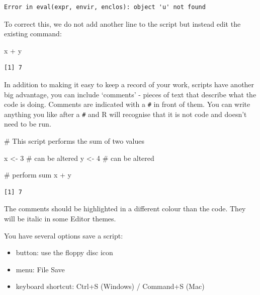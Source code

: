 \documentclass[
  letterpaper,
  DIV=11,
  numbers=noendperiod]{scrreprt}
\newenvironment{Shaded}{\begin{snugshade}}{\end{snugshade}}
\newcommand{\CommentTok}[1]{\textcolor[rgb]{0.37,0.37,0.37}{#1}}
\newcommand{\DecValTok}[1]{\textcolor[rgb]{0.68,0.00,0.00}{#1}}
\newcommand{\NormalTok}[1]{\textcolor[rgb]{0.00,0.23,0.31}{#1}}
\newcommand{\OtherTok}[1]{\textcolor[rgb]{0.00,0.23,0.31}{#1}}
\newcommand{\SpecialCharTok}[1]{\textcolor[rgb]{0.37,0.37,0.37}{#1}}
\providecommand{\tightlist}{%
  \setlength{\itemsep}{0pt}\setlength{\parskip}{0pt}}\usepackage{longtable,booktabs,array}
\begin{document}
\begin{verbatim}
Error in eval(expr, envir, enclos): object 'u' not found
\end{verbatim}

To correct this, we do not add another line to the script but instead
edit the existing command:

\begin{Shaded}
\begin{Highlighting}[]
\NormalTok{x }\SpecialCharTok{+}\NormalTok{ y}
\end{Highlighting}
\end{Shaded}

\begin{verbatim}
[1] 7
\end{verbatim}

In addition to making it easy to keep a record of your work, scripts
have another big advantage, you can include `comments' - pieces of text
that describe what the code is doing. Comments are indicated with a
\texttt{\#} in front of them. You can write anything you like after a
\texttt{\#} and R will recognise that it is not code and doesn't need to
be run.

\begin{Shaded}
\begin{Highlighting}[]
\CommentTok{\# This script performs the sum of two values}

\NormalTok{x }\OtherTok{\textless{}{-}} \DecValTok{3}    \CommentTok{\# can be altered}
\NormalTok{y }\OtherTok{\textless{}{-}} \DecValTok{4}    \CommentTok{\# can be altered}

\CommentTok{\# perform sum}
\NormalTok{x }\SpecialCharTok{+}\NormalTok{ y}
\end{Highlighting}
\end{Shaded}

\begin{verbatim}
[1] 7
\end{verbatim}

The comments should be highlighted in a different colour than the code.
They will be italic in some Editor themes.

You have several options save a script:

\begin{itemize}
\tightlist
\item
  button: use the floppy disc icon
\item
  menu: File \textbar{} Save
\item
  keyboard shortcut: Ctrl+S (Windows) / Command+S (Mac)
\end{itemize}
\end{document}
